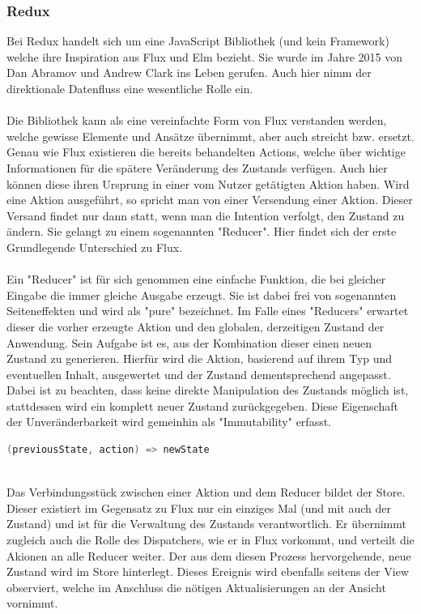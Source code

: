\subsubsection{Redux}
Bei Redux handelt sich um eine JavaScript Bibliothek (und kein Framework) welche ihre Inspiration aus Flux und Elm bezieht. Sie wurde im Jahre 2015 von Dan Abramov und Andrew Clark ins Leben gerufen.
\cite{reduxIntroduction}
Auch hier nimm der direktionale Datenfluss eine wesentliche Rolle ein.
\\
\\
Die Bibliothek kann als eine vereinfachte Form von Flux verstanden werden, welche gewisse Elemente und Ansätze übernimmt, aber auch streicht bzw. ersetzt. Genau wie Flux existieren die bereits behandelten Actions, welche über wichtige Informationen für die spätere Veränderung des Zustands verfügen. Auch hier können diese ihren Ursprung in einer vom Nutzer getätigten Aktion haben. Wird eine Aktion ausgeführt, so spricht man von einer Versendung einer Aktion. Dieser Versand findet nur dann statt, wenn man die Intention verfolgt, den Zustand zu ändern. Sie gelangt zu einem sogenannten "Reducer". Hier findet sich der erste Grundlegende Unterschied zu Flux.
\\
\\
Ein "Reducer" ist für sich genommen eine einfache Funktion, die bei gleicher Eingabe die immer gleiche Ausgabe erzeugt. Sie ist dabei frei von sogenannten Seiteneffekten und wird als "pure" bezeichnet. Im Falle eines "Reducers" erwartet dieser die vorher erzeugte Aktion und den globalen, derzeitigen Zustand der Anwendung. Sein Aufgabe ist es, aus der Kombination dieser einen neuen Zustand zu generieren. Hierfür wird die Aktion, basierend auf ihrem Typ und eventuellen Inhalt, ausgewertet und der Zustand dementsprechend angepasst. Dabei ist zu beachten, dass keine direkte Manipulation des Zustands möglich ist, stattdessen wird ein komplett neuer Zustand zurückgegeben. Diese Eigenschaft der Unveränderbarkeit wird gemeinhin als "Immutability" erfasst.
\\
\begin{lstlisting}[frame=single, language=Java]
(previousState, action) => newState
\end{lstlisting}
\ \\
Das Verbindungsstück zwischen einer Aktion und dem Reducer bildet der Store. Dieser existiert im Gegensatz zu Flux nur ein einziges Mal (und mit auch der Zustand) und ist für die Verwaltung des Zustands verantwortlich. Er übernimmt zugleich auch die Rolle des Dispatchers, wie er in Flux vorkommt, und verteilt die Akionen an alle Reducer weiter. Der aus dem diesen Prozess hervorgehende, neue Zustand wird im Store hinterlegt. Dieses Ereignis wird ebenfalls seitens der View observiert, welche im Anschluss die nötigen Aktualisierungen an der Ansicht vornimmt.
